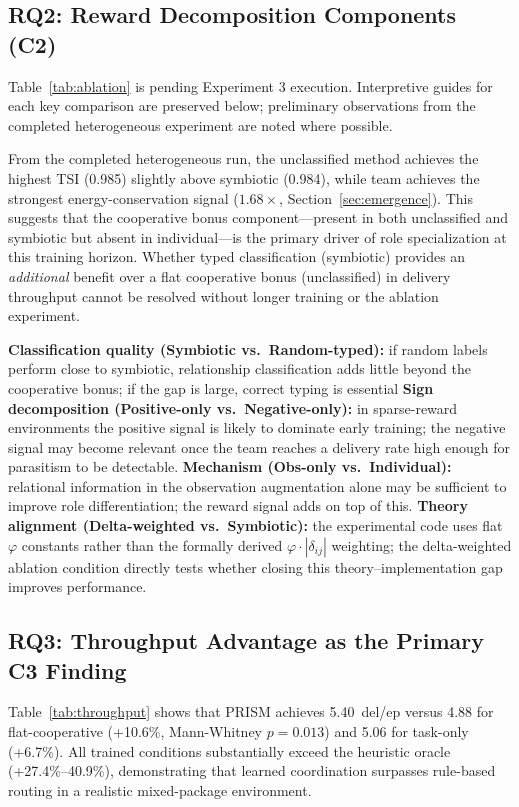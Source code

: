 \documentclass[Afour,sageh,times]{sagej}
\begin{document}
\subsection{RQ2: Reward Decomposition Components (C2)}
\label{sec:disc_rq2}

Table~\ref{tab:ablation} is pending Experiment 3 execution. Interpretive guides for each key comparison are preserved below; preliminary observations from the completed heterogeneous experiment are noted where possible.

From the completed heterogeneous run, the unclassified method achieves the highest TSI (0.985) slightly above symbiotic (0.984), while team achieves the strongest energy-conservation signal ($1.68\times$, Section~\ref{sec:emergence}). This suggests that the cooperative bonus component---present in both unclassified and symbiotic but absent in individual---is the primary driver of role specialization at this training horizon. Whether typed classification (symbiotic) provides an \emph{additional} benefit over a flat cooperative bonus (unclassified) in delivery throughput cannot be resolved without longer training or the ablation experiment.

\textbf{Classification quality (Symbiotic vs.\ Random-typed):} if random labels perform close to symbiotic, relationship classification adds little beyond the cooperative bonus; if the gap is large, correct typing is essential 
\textbf{Sign decomposition (Positive-only vs.\ Negative-only):} in sparse-reward environments the positive signal is likely to dominate early training; the negative signal may become relevant once the team reaches a delivery rate high enough for parasitism to be detectable.
\textbf{Mechanism (Obs-only vs.\ Individual):} relational information in the observation augmentation alone may be sufficient to improve role differentiation; the reward signal adds on top of this.
\textbf{Theory alignment (Delta-weighted vs.\ Symbiotic):} the experimental code uses flat $\varphi$ constants rather than the formally derived $\varphi \cdot |\delta_{ij}|$ weighting; the delta-weighted ablation condition directly tests whether closing this theory--implementation gap improves performance.

\subsection{RQ3: Throughput Advantage as the Primary C3 Finding}
\label{sec:disc_rq3}

Table~\ref{tab:throughput} shows that PRISM achieves 5.40~del/ep versus 4.88 for flat-cooperative (+10.6\%, Mann-Whitney $p{=}0.013$) and 5.06 for task-only (+6.7\%). All trained conditions substantially exceed the heuristic oracle (+27.4\%–40.9\%), demonstrating that learned coordination surpasses rule-based routing in a realistic mixed-package environment.
\end{document}
